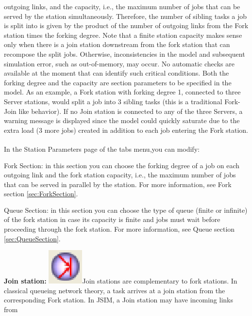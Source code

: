 \begin{enumerate*}
outgoing links, and the capacity, i.e., the maximum number of jobs
that can be served by the station simultaneously. Therefore, the
number of sibling tasks a job is split into is given by the
product of the number of outgoing links from the Fork station
times the forking degree. Note that a finite station capacity
makes sense only when there is a join station downstream from the
fork station that can recompose the split jobs. Otherwise,
inconsistencies in the model and subsequent simulation error, such
as out-of-memory, may occur. No automatic checks are available at
the moment that can identify such critical conditions. Both the
forking degree and the capacity are section parameters to be
specified in the model. As an example, a Fork station with forking degree 1, connected to three Server stations, would split a job into 3 sibling tasks (this is a traditional Fork-Join like behavior). If no Join station is connected to any of the three Servers, a warning message is displayed since the model could quickly saturate due to the extra load (3 more jobs) created in addition to each job entering the Fork station.\\\\
In the Station Parameters page of the tabs menu,you can modify:\\
\begin{description*}
\item[Fork Section:] in this section you can choose the forking degree of a job on each outgoing link and the fork station capacity, i.e., the maximum number
of jobs that can be served in parallel by the station.
For more information, see Fork section \autoref{sec:ForkSection}.
\item[Queue Section:] in this section you can choose the type of queue (finite or infinite) of the fork station in case its capacity is finite and jobs must wait before
proceeding through the fork station.
For more information, see Queue section \autoref{sec:QueueSection}.
\end{description*}
\item \textbf{Join station:}
\includegraphics[scale=0.5]{img/jsim/join.eps}Join stations are
complementary to fork stations. In classical queueing network
theory, a task arrives at a join station from the corresponding
Fork station. In JSIM, a Join station may have incoming links from

\end{enumerate*}
